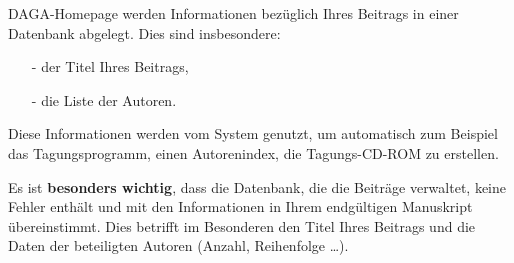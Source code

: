 \documentclass[a4paper, 10pt, twocolumn]{article}
\begin{document}
DAGA-Homepage werden Informationen bezüglich Ihres Beitrags in
einer Datenbank abgelegt. Dies sind insbesondere:
\begin{itemize}
    \item[-] der Titel Ihres Beitrags,
    \item[-] die Liste der Autoren.
\end{itemize}
Diese Informationen werden vom System genutzt, um automatisch zum Beispiel das Tagungsprogramm, einen Autorenindex, die Tagungs-CD-ROM zu erstellen.

Es ist \textbf{besonders wichtig}, dass die Datenbank, die die Beiträge verwaltet, keine Fehler enthält und mit den Informationen in Ihrem endgültigen Manuskript übereinstimmt. Dies betrifft im Besonderen den Titel Ihres Beitrags und die Daten der beteiligten Autoren (Anzahl, Reihenfolge \ldots).
\end{document}
